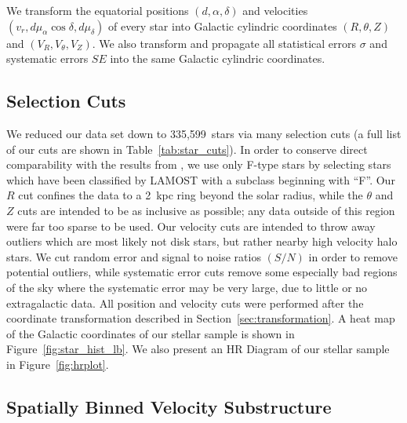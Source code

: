 \documentclass[11pt,preprint]{aastex6}
\begin{document}
We transform the equatorial positions $(d,\alpha,\delta)$ and velocities $(v_r,d\mu_\alpha \cos{\delta},d\mu_\delta)$ of every star into Galactic cylindric coordinates $(R,\theta,Z)$ and $(V_R, V_\theta, V_Z)$.
We also transform and propagate all statistical errors $\sigma$ and systematic errors $SE$ into the same Galactic cylindric coordinates.

\subsection{Selection Cuts}

We reduced our data set down to 335,599~stars via many selection cuts (a full list of our cuts are shown in Table~\ref{tab:star_cuts}).
In order to conserve direct comparability with the results from \citet{Carlin2013}, we use only F-type stars by selecting stars which have been classified by LAMOST with a subclass beginning with ``F''. %
Our $R$ cut confines the data to a 2~kpc ring beyond the solar radius, while the $\theta$ and $Z$ cuts are intended to be as inclusive as possible; any data outside of this region were far too sparse to be used.
Our velocity cuts are intended to throw away outliers which are most likely not disk stars, but rather nearby high velocity halo stars.
We cut random error and signal to noise ratios $(S/N)$ in order to remove potential outliers, while systematic error cuts remove some especially bad regions of the sky where the systematic error may be very large, due to little or no extragalactic data.
All position and velocity cuts were performed after the coordinate transformation described in Section~\ref{sec:transformation}.
A heat map of the Galactic coordinates of our stellar sample is shown in Figure~\ref{fig:star_hist_lb}.
We also present an HR Diagram of our stellar sample in Figure~\ref{fig:hrplot}.


\subsection{Spatially Binned Velocity Substructure} \label{sec:binning}
\end{document}

